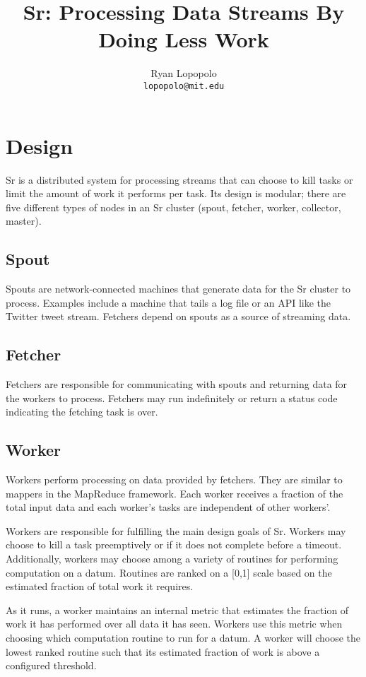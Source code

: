 \documentclass[12pt]{article}
\title{Sr: Processing Data Streams By Doing Less Work}
\author{Ryan Lopopolo\\
\texttt{lopopolo@mit.edu}}
\begin{document}
\twocolumn
\maketitle


\section{Design}
Sr is a distributed system for processing streams that can choose to kill tasks or limit the amount of work it performs per task. Its design is modular; there are five different types of nodes in an Sr cluster (spout, fetcher, worker, collector, master).
\subsection{Spout}
Spouts are network-connected machines that generate data for the Sr cluster to process. Examples include a machine that tails a log file or an API like the Twitter tweet stream. Fetchers depend on spouts as a source of streaming data.
\subsection{Fetcher}
Fetchers are responsible for communicating with spouts and returning data for the workers to process. Fetchers may run indefinitely or return a status code indicating the fetching task is over.
\subsection{Worker}
Workers perform processing on data provided by fetchers. They are similar to mappers in the MapReduce framework. Each worker receives a fraction of the total input data and each worker’s tasks are independent of other workers’.

Workers are responsible for fulfilling the main design goals of Sr. Workers may choose to kill a task preemptively or if it does not complete before a timeout. Additionally, workers may choose among a variety of routines for performing computation on a datum. Routines are ranked on a [0,1] scale based on the estimated fraction of total work it requires.

As it runs, a worker maintains an internal metric that estimates the fraction of work it has performed over all data it has seen. Workers use this metric when choosing which computation routine to run for a datum. A worker will choose the lowest ranked routine such that its estimated fraction of work is above a configured threshold.
\end{document}
